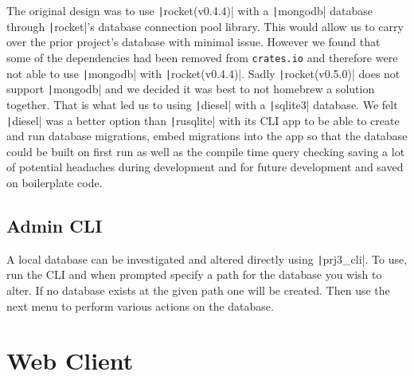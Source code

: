 \documentclass{article}
\begin{document}
The original design was to use \texttt|rocket(v0.4.4)| with a \texttt|mongodb| database through \texttt|rocket|'s database connection pool library.
This would allow us to carry over the prior project's database with minimal issue.
However we found that some of the dependencies had been removed from \texttt{crates.io} and therefore were not able to use \texttt|mongodb| with \texttt|rocket(v0.4.4)|.
Sadly \texttt|rocket(v0.5.0)| does not support \texttt|mongodb| and we decided it was best to not homebrew a solution together.  That is what led us to using \texttt|diesel|
with a \texttt|sqlite3| database. We felt \texttt|diesel| was a better option than \texttt|rusqlite| with its CLI app to be able to create and run database migrations,
embed migrations into the app so that the database could be built on first run as well as the compile time query checking saving a lot of potential headaches during development and for future development and saved on boilerplate code.

\pagebreak

\subsection{Admin CLI}

A local database can be investigated and altered directly using \texttt|prj3_cli|.
To use, run the CLI and when prompted specify a path for the database you wish to alter.
If no database exists at the given path one will be created.  Then use the next menu to perform various actions on the database.

\section{Web Client}
\end{document}
